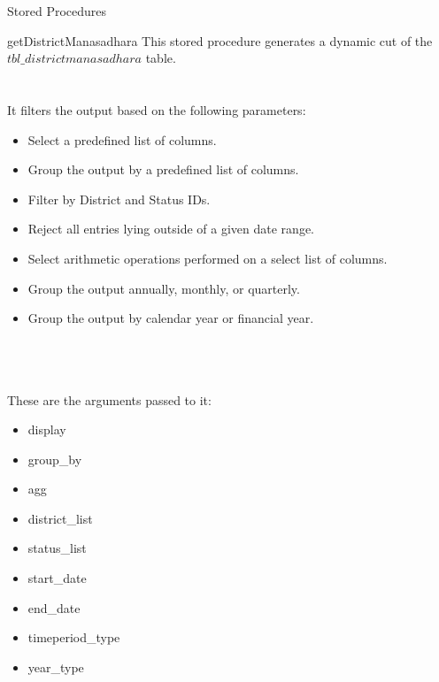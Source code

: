 \documentclass[
10pt, %
a4paper, %
oneside, %
headinclude,footinclude, %
BCOR5mm, %
]{scrartcl}
\begin{document}
\begin{section}{Stored Procedures}
\begin{subsection}{getDistrictManasadhara}
This stored procedure generates a dynamic cut of the $tbl\_districtmanasadhara$ table. \\ \\ \\
It filters the output based on the following parameters: 
\begin{itemize}
        \item Select a predefined list of columns.
        \item Group the output by a predefined list of columns.
        \item Filter by District and Status IDs.
        \item Reject all entries lying outside of a given date range.
        \item Select arithmetic operations performed on a select list of columns.
        \item Group the output annually, monthly, or quarterly.
        \item Group the output by calendar year or financial year.
\end{itemize} 
\\ \\ \\
These are the arguments passed to it: 
\begin{itemize}
        \item display
        \item group\_by
        \item agg
        \item district\_list
        \item status\_list
        \item start\_date
        \item end\_date
        \item timeperiod\_type
        \item year\_type
\end{itemize}

\end{subsection}

\newpage



\end{section}
\end{document}
